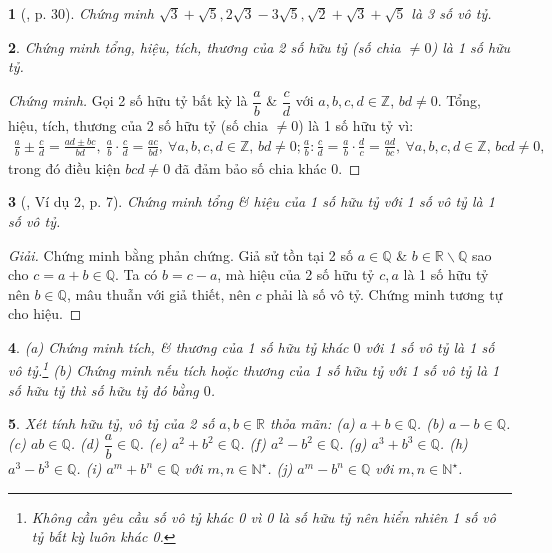 \documentclass{article}
\newtheorem{baitoan}{}%
\begin{document}
\begin{baitoan}[\cite{Binh_boi_duong_Toan_9_tap_1}, p. 30]
	Chứng minh $\sqrt{3} + \sqrt{5},2\sqrt{3} - 3\sqrt{5},\sqrt{2} + \sqrt{3} + \sqrt{5}$ là 3 số vô tỷ.
\end{baitoan}

\begin{baitoan}
	Chứng minh tổng, hiệu, tích, thương của 2 số hữu tỷ (số chia $\ne0$) là 1 số hữu tỷ.
\end{baitoan}

\begin{proof}[Chứng minh]
	Gọi 2 số hữu tỷ bất kỳ là $\dfrac{a}{b}$ \& $\dfrac{c}{d}$ với $a,b,c,d\in\mathbb{Z}$, $bd\ne0$. Tổng, hiệu, tích, thương của 2 số hữu tỷ (số chia $\ne0$) là 1 số hữu tỷ vì:
	\begin{align*}
		\frac{a}{b}\pm\frac{c}{d} = \frac{ad\pm bc}{bd},\ \frac{a}{b}\cdot\frac{c}{d} = \frac{ac}{bd},\ \forall a,b,c,d\in\mathbb{Z},\,bd\ne0; \frac{a}{b}:\frac{c}{d} = \frac{a}{b}\cdot\frac{d}{c} = \frac{ad}{bc},\ \forall a,b,c,d\in\mathbb{Z},\,bcd\ne0,
	\end{align*}
	trong đó điều kiện $bcd\ne0$ đã đảm bảo số chia khác 0.
\end{proof}

\begin{baitoan}[\cite{Binh_Toan_9_tap_1}, Ví dụ 2, p. 7]
	Chứng minh tổng \& hiệu của 1 số hữu tỷ với 1 số vô tỷ là 1 số vô tỷ.
\end{baitoan}

\begin{proof}[Giải]
	Chứng minh bằng phản chứng. Giả sử tồn tại 2 số $a\in\mathbb{Q}$ \& $b\in\mathbb{R}\backslash\mathbb{Q}$ sao cho $c = a + b\in\mathbb{Q}$. Ta có $b = c - a$, mà hiệu của 2 số hữu tỷ $c,a$ là 1 số hữu tỷ nên $b\in\mathbb{Q}$, mâu thuẫn với giả thiết, nên $c$ phải là số vô tỷ. Chứng minh tương tự cho hiệu.
\end{proof}

\begin{baitoan}
	(a) Chứng minh tích, \& thương của 1 số hữu tỷ khác $0$ với 1 số vô tỷ là 1 số vô tỷ.\footnote{Không cần yêu cầu số vô tỷ khác 0 vì 0 là số hữu tỷ nên hiển nhiên 1 số vô tỷ bất kỳ luôn khác 0.} (b) Chứng minh nếu tích hoặc thương của 1 số hữu tỷ với 1 số vô tỷ là 1 số hữu tỷ thì số hữu tỷ đó bằng $0$. 
\end{baitoan}

\begin{baitoan}
	Xét tính hữu tỷ, vô tỷ của 2 số $a,b\in\mathbb{R}$ thỏa mãn: (a) $a + b\in\mathbb{Q}$. (b) $a - b\in\mathbb{Q}$. (c) $ab\in\mathbb{Q}$. (d) $\dfrac{a}{b}\in\mathbb{Q}$. (e) $a^2 + b^2\in\mathbb{Q}$. (f) $a^2 - b^2\in\mathbb{Q}$. (g) $a^3 + b^3\in\mathbb{Q}$. (h) $a^3 - b^3\in\mathbb{Q}$. (i) $a^m + b^n\in\mathbb{Q}$ với $m,n\in\mathbb{N}^\star$. (j) $a^m - b^n\in\mathbb{Q}$ với $m,n\in\mathbb{N}^\star$.
\end{baitoan}
\end{document}
